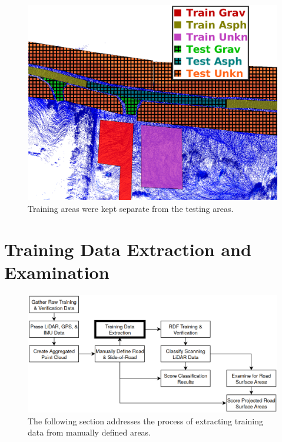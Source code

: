 \documentclass[numbered,pdftex]{ohio-etd}
\begin{document}
{{		\begin{figure}[H]
			\centering
			\includegraphics[width=0.95\linewidth]{Defense_Images/test_vs_train_areas_hatch}
			\caption[Training vs Testing Areas]{Training areas were kept separate from the testing areas.}
			\label{fig:test_vs_train_areas_in_results}
		\end{figure}
		
		
		
	}
	
	

	\section{Training Data Extraction and Examination}\label{sec:training_data_extraction}{
		
		\begin{figure}[H]
			\centering
			\includegraphics[width=0.9\linewidth]{Defense_Images/flowz_train_data_extract}
			\caption[Training Data Extraction Flowchart Context]{The following section addresses the process of extracting training data from manually defined areas.}
			\label{fig:flowz_train_data_extract}
		\end{figure}
		
}}
\end{document}
